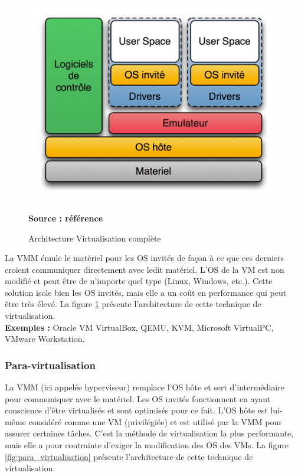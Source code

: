 \begin{figure}[H]
      \centering
      \includegraphics[scale=.8]{fig1/virtualisation_complete.png}
      \caption{Architecture Virtualisation complète}
      \label{fig:virualisation_complete}
      \centering \bfseries Source : référence \cite{online2}
\end{figure}

\noindent La VMM émule le matériel pour les OS invités de façon à ce que ces derniers croient communiquer directement avec ledit matériel. L'OS de la VM est non modifié et peut être de n'importe quel type (Linux, Windows, etc.). Cette solution isole bien les OS invités, mais elle a un coût en performance qui peut être très élevé.  La figure \ref{fig:virualisation_complete} présente l'architecture de cette technique de virtualisation.\\

\noindent \textbf{Exemples :} Oracle VM VirtualBox, QEMU, KVM, Microsoft VirtualPC, VMware Workstation.

\subsubsection{Para-virtualisation}
La VMM (ici appelée hyperviseur) remplace l'OS hôte et sert d'intermédiaire pour communiquer avec le matériel. Les OS invités fonctionnent en ayant conscience d'être virtualisés et sont optimisés pour ce fait. L'OS hôte est lui-même considéré comme une VM (privilégiée) et est utilisé par la VMM pour assurer certaines tâches. C'est la méthode de virtualisation la plus performante, mais elle a pour contrainte d'exiger la modification des OS des VMs. La figure \ref{fig:para_virtualisation} présente l'architecture de cette technique de virtualisation.

